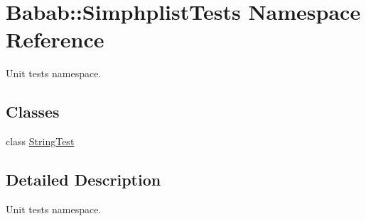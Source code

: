 \hypertarget{namespaceBabab_1_1SimphplistTests}{\section{Babab\+:\+:Simphplist\+Tests Namespace Reference}
\label{namespaceBabab_1_1SimphplistTests}
}


Unit tests namespace.  


\subsection*{Classes}
\begin{DoxyCompactItemize}
\item 
class \hyperlink{classBabab_1_1SimphplistTests_1_1StringTest}{String\+Test}
\end{DoxyCompactItemize}


\subsection{Detailed Description}
Unit tests namespace. 